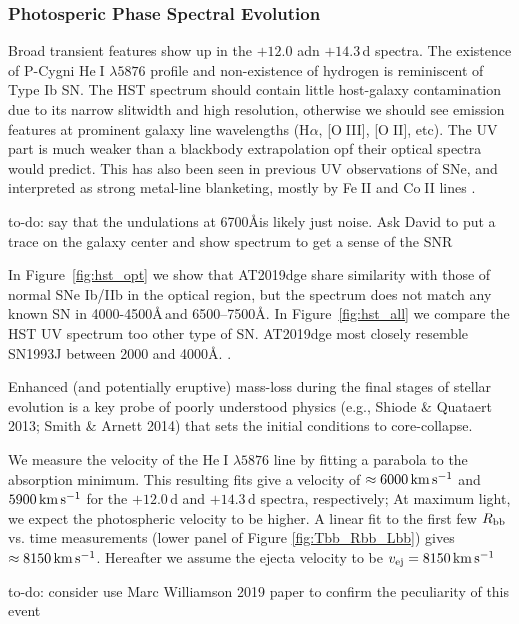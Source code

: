 \documentclass[twocolumn]{aastex63}
\def\ion#1#2{#1$\;${\footnotesize\rm{#2}}\relax}
\newcommand{\todo}[1]{{\color{magenta} to-do: {#1}}}
\begin{document}
\begin{CJK*}{UTF8}{gbsn}
\subsubsection{Photosperic Phase Spectral Evolution}
Broad transient features show up in the $+12.0$ adn $+14.3$\,d spectra. The existence of P-Cygni 
\ion{He}{I} $\lambda5876$ profile and non-existence of hydrogen is reminiscent of Type Ib 
SN. The HST spectrum should contain little host-galaxy contamination due to its narrow 
slitwidth and high resolution, otherwise we should see emission features at prominent galaxy line 
wavelengths (H$\alpha$, [\ion{O}{III}], [\ion{O}{II}], etc). The UV part is much weaker than a blackbody 
extrapolation opf their optical spectra would predict. This has also been seen in previous UV 
observations of SNe, and interpreted as strong metal-line blanketing, mostly by \ion{Fe}{II} and 
\ion{Co}{II} lines \citep{Gal-Yam2008}.

\todo{say that the undulations at 6700\AA is likely just noise. Ask David to put a trace on the galaxy 
center and show spectrum to get a sense of the SNR}

In Figure~\ref{fig:hst_opt} we show that AT2019dge share similarity with those of normal SNe Ib/IIb in 
the optical region, but the spectrum does not match any known SN in 4000-4500\AA\,and 
6500--7500\AA. In Figure~\ref{fig:hst_all} we compare the HST UV spectrum too other type of SN. 
AT2019dge most closely resemble SN1993J between 2000 and 4000\AA. .

Enhanced (and potentially eruptive) mass-loss during the final stages of stellar evolution is a key probe 
of poorly understood physics (e.g., Shiode \& Quataert 2013; Smith \& Arnett 2014) that sets the initial 
conditions to core-collapse. 

We measure the velocity of the \ion{He}{I} $\lambda5876$ line by fitting a parabola to the absorption 
minimum. This resulting fits give a velocity of $\approx 6000\, {\rm km\,s^{-1}}$ and $ 5900\, {\rm 
km\,s^{-1}}$ for the $+12.0$\,d and $+14.3$\,d spectra, respectively; At maximum light, we expect the 
photospheric velocity to be higher. A linear fit to the first few $R_{\rm bb}$ vs. time measurements 
(lower panel of Figure \ref{fig:Tbb_Rbb_Lbb}) gives $\approx 8150\, {\rm km\,s^{-1}}$. Hereafter we 
assume the ejecta velocity to be $v_{\rm ej} = 8150\, {\rm km\,s^{-1}}$


\todo{consider use Marc Williamson 2019 paper to confirm the peculiarity of this event}


\end{CJK*}
\end{document}
